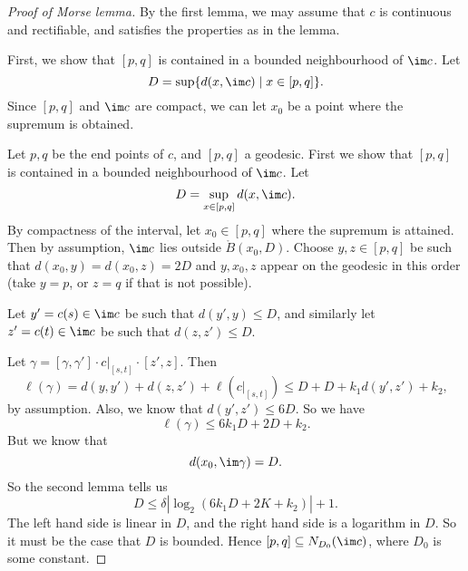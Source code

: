 \documentclass[a4paper]{article}
\begin{document}
\begin{proof}[Proof of Morse lemma]
  By the first lemma, we may assume that $c$ is continuous and rectifiable, and satisfies the properties as in the lemma.

  First, we show that $[p, q]$ is contained in a bounded neighbourhood of $\im c$. Let
  \[
    D = \sup\{d(x, \im c) \mid x \in [p, q]\}.
  \]
  Since $[p, q]$ and $\im c$ are compact, we can let $x_0$ be a point where the supremum is obtained.

  Let $p, q$ be the end points of $c$, and $[p, q]$ a geodesic. First we show that $[p, q]$ is contained in a bounded neighbourhood of $\im c$. Let
  \[
    D = \sup_{x \in [p, q]} d(x, \im c).
  \]
  By compactness of the interval, let $x_0 \in [p, q]$ where the supremum is attained. Then by assumption, $\im c$ lies outside $\mathring{B}(x_0, D)$. Choose $y, z \in [p, q]$ be such that $d(x_0, y) = d(x_0, z) = 2D$ and $y, x_0, z$ appear on the geodesic in this order (take $y = p$, or $z = q$ if that is not possible).

  Let $y' = c(s) \in \im c$ be such that $d(y', y) \leq D$, and similarly let $z' = c(t) \in \im c$ be such that $d(z, z') \leq D$.
  \begin{center}
  \end{center}
  Let $\gamma = [\gamma, \gamma'] \cdot c|_{[s, t]} \cdot [z', z]$. Then
  \[
    \ell(\gamma) = d(y, y') + d(z, z') + \ell(c|_{[s, t]}) \leq D + D + k_1 d(y', z') + k_2,
  \]
  by assumption. Also, we know that $d(y', z') \leq 6D$. So we have
  \[
    \ell(\gamma) \leq 6k_1D + 2D + k_2.
  \]
  But we know that
  \[
    d(x_0, \im \gamma) = D.
  \]
  So the second lemma tells us
  \[
    D \leq \delta |\log_2 (6 k_1 D + 2K + k_2)| + 1.
  \]
  The left hand side is linear in $D$, and the right hand side is a logarithm in $D$. So it must be the case that $D$ is bounded. Hence $[p, q] \subseteq N_{D_0}(\im c)$, where $D_0$ is some constant.


\end{proof}
\end{document}
